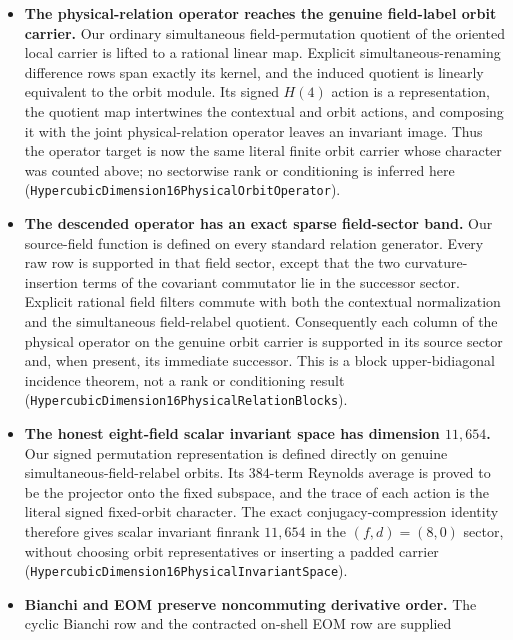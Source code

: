 \documentclass[11pt]{article}
\theoremstyle{definition}
\begin{document}
\begin{itemize}
    and assembly theorem, not yet a physical-rank claim
    (\texttt{HypercubicDimension16PhysicalRelationOperator}).
  \item \textbf{The physical-relation operator reaches the genuine
    field-label orbit carrier.} Our ordinary simultaneous field-permutation
    quotient of the oriented local carrier is lifted to a rational linear
    map.  Explicit simultaneous-renaming difference rows span exactly its
    kernel, and the induced quotient is linearly equivalent to the orbit
    module.  Its signed $H(4)$ action is a representation, the quotient map
    intertwines the contextual and orbit actions, and composing it with the
    joint physical-relation operator leaves an invariant image.  Thus the
    operator target is now the same literal finite orbit carrier whose
    character was counted above; no sectorwise rank or conditioning is
    inferred here
    (\texttt{HypercubicDimension16PhysicalOrbitOperator}).
  \item \textbf{The descended operator has an exact sparse field-sector
    band.} Our source-field function is defined on every standard relation
    generator.  Every raw row is supported in that field sector, except that
    the two curvature-insertion terms of the covariant commutator lie in the
    successor sector.  Explicit rational field filters commute with both the
    contextual normalization and the simultaneous field-relabel quotient.
    Consequently each column of the physical operator on the genuine orbit
    carrier is supported in its source sector and, when present, its immediate
    successor.  This is a block upper-bidiagonal incidence theorem, not a rank
    or conditioning result
    (\texttt{HypercubicDimension16PhysicalRelationBlocks}).
  \item \textbf{The honest eight-field scalar invariant space has dimension
    $11{,}654$.} Our signed permutation representation is defined directly on
    genuine simultaneous-field-relabel orbits.  Its $384$-term Reynolds
    average is proved to be the projector onto the fixed subspace, and the
    trace of each action is the literal signed fixed-orbit character.  The
    exact conjugacy-compression identity therefore gives scalar invariant
    finrank $11{,}654$ in the $(f,d)=(8,0)$ sector, without choosing orbit
    representatives or inserting a padded carrier
    (\texttt{HypercubicDimension16PhysicalInvariantSpace}).
  \item \textbf{Bianchi and EOM preserve noncommuting derivative order.}
    The cyclic Bianchi row and the contracted on-shell EOM row are supplied

\end{itemize}
\end{document}
